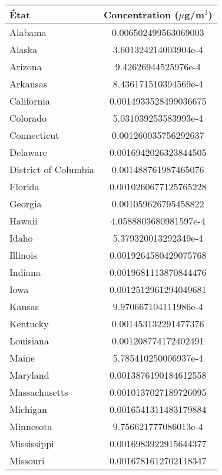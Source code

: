 \begin{tabular}{lS[table-format=1.4, scientific-notation = fixed, fixed-exponent = 0, round-mode = figures, round-precision = 4]}
	\toprule
	État & {Concentration ($\mu$g/m$^3$)} \\
	\midrule
Alabama & 0.006502499563069003 \\
Alaska & 3.601324214003904e-4 \\
Arizona & 9.42626944525976e-4 \\
Arkansas & 8.436171510394569e-4 \\
California & 0.0014933528499036675 \\
Colorado & 5.031039253583993e-4 \\
Connecticut & 0.001260035756292637 \\
Delaware & 0.0016942026323844505 \\
District of Columbia & 0.001488761987465076 \\
Florida & 0.0010260677125765228 \\
Georgia & 0.001059626795458822 \\
Hawaii & 4.0588803680981597e-4 \\
Idaho & 5.379320013292349e-4 \\
Illinois & 0.0019264580429075768 \\
Indiana & 0.0019681113870844476 \\
Iowa & 0.0012512961294049681 \\
Kansas & 9.970667104111986e-4 \\
Kentucky & 0.001453132291477376 \\
Louisiana & 0.001208774172402491 \\
Maine & 5.785410250006937e-4 \\
Maryland & 0.0013876190184612558 \\
Massachusetts & 0.0010137027189726095 \\
Michigan & 0.0016541311483179884 \\
Minnesota & 9.756621777086013e-4 \\
Mississippi & 0.0016983922915644377 \\
Missouri & 0.0016781612702118347 \\
	\bottomrule
\end{tabular}